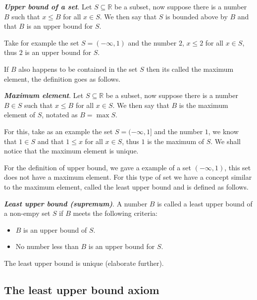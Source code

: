 \documentclass{report}
\begin{document}
    \begin{defBox}
        \textit{\textbf{Upper bound of a set}}. Let $S \subseteq \mathbb{R}$ be a subset, now suppose there is a number $B$ such that $x \leq B$ for all $x \in S$. We then say that $S$ is bounded above by $B$ and that $B$ is an upper bound for $S$.
    \end{defBox}

    Take for example the set $S = (- \infty, 1)$ and the number $2$, $x \leq 2$ for all $x \in S$, thus $2$ is an upper bound for $S$.

    If $B$ also happens to be contained in the set $S$ then its called the maximum element, the definition goes as follows.

    \begin{defBox}
        \textit{\textbf{Maximum element}}. Let $S \subseteq \mathbb{R}$ be a subset, now suppose there is a number $B \in S$ such that $x \leq B$ for all $x \in S$. We then say that $B$ is the maximum element of $S$, notated as $B = \max S$.
    \end{defBox}

    For this, take as an example the set $S = (- \infty, 1]$ and the number $1$, we know that $1 \in S$ and that $1 \leq x$ for all $x \in S$, thus $1$ is the maximum of $S$. We shall notice that the maximum element is unique.

    For the definition of upper bound, we gave a example of a set $(-\infty, 1)$, this set does not have a maximum element. For this type of set we have a concept similar to the maximum element, called the least upper bound and is defined as follows.

    \begin{defBox}
        \textit{\textbf{Least upper bound (supremum)}}. A number $B$ is called a least upper bound of a non-empy set $S$ if $B$ meets the following criteria:

        \begin{itemize}
            \item $B$ is an upper bound of $S$.
            \item No number less than $B$ is an upper bound for $S$.
        \end{itemize}
    \end{defBox}

    The least upper bound is unique (elaborate further).

    \subsection*{The least upper bound axiom}
\end{document}

